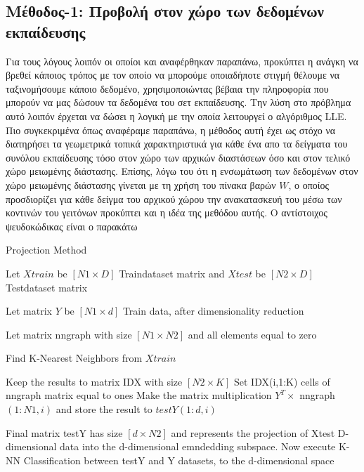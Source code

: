 \subsection{Μέθοδος-1: Προβολή στον χώρο των δεδομένων εκπαίδευσης}
\par
Για τους λόγους λοιπόν οι οποίοι και αναφέρθηκαν παραπάνω, προκύπτει η ανάγκη να βρεθεί κάποιος τρόπος με τον οποίο να μπορούμε οποιαδήποτε στιγμή θέλουμε να ταξινομήσουμε κάποιο δεδομένο, χρησιμοποιώντας βέβαια την πληροφορία που μπορούν να μας δώσουν τα δεδομένα του σετ εκπαίδευσης. Την λύση στο πρόβλημα αυτό λοιπόν έρχεται να δώσει η λογική με την οποία λειτουργεί ο αλγόριθμος \textlatin{LLE}. Πιο συγκεκριμένα όπως αναφέραμε παραπάνω, η μέθοδος αυτή έχει ως στόχο να διατηρήσει τα γεωμετρικά τοπικά χαρακτηριστικά για κάθε ένα απο τα δείγματα του συνόλου εκπαίδευσης τόσο στον χώρο των αρχικών διαστάσεων όσο και στον τελικό χώρο μειωμένης διάστασης. Επίσης, λόγω του ότι η ενσωμάτωση των δεδομένων στον χώρο μειωμένης διάστασης γίνεται με τη χρήση του πίνακα βαρών $W$, ο οποίος προσδιορίζει για κάθε δείγμα του αρχικού χώρου την ανακατασκευή του μέσω των κοντινών του γειτόνων προκύπτει και η ιδέα της μεθόδου αυτής. Ο αντίστοιχος ψευδοκώδικας είναι ο παρακάτω
\begin{algorithm}
   \caption{Projection Method}
    \begin{algorithmic}[1]   	
    	\State Let $Xtrain$ be $[N1 \times D]$ Train\textunderscore dataset matrix and $Xtest$ be $[N2 \times D]$ Test\textunderscore dataset matrix 
		\State 
    	
    	\State Let matrix $Y$ be $[N1 \times d]$ Train data, after dimensionality reduction 
    	\State
    	
    	\State Let matrix nn\textunderscore graph with size $[N1 \times N2]$ and all elements equal to zero
    	\State 
        
            \State Find K-Nearest Neighbors from $Xtrain$
        \EndFor
        \State
		
		\State Keep the results to matrix IDX with size $[N2 \times K]$ 
            \State Set IDX(i,1:K) cells of nn\textunderscore graph matrix equal to ones
            \State Make the matrix multiplication $Y^{T} \times$ nn\textunderscore graph$(1:N1,i)$ and store the result to $testY(1:d,i)$ 
        \EndFor
        \State 
        
        \State Final matrix testY has size $[d \times N2]$ and represents the projection of Xtest D-dimensional data into the d-dimensional emndedding subspace.  
        \State
        \State Now execute K-NN Classification between testY and Y datasets, to the d-dimensional space
	\end{algorithmic}
\end{algorithm}
